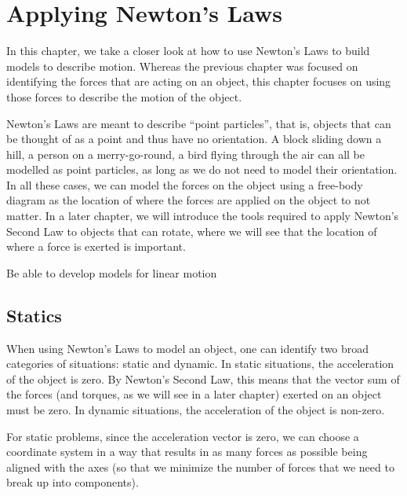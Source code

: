 
\chapter{Applying Newton's Laws}
\label{chap:ApplyingNewtonsLaws}
In this chapter, we take a closer look at how to use Newton's Laws to build models to describe motion. Whereas the previous chapter was focused on identifying the forces that are acting on an object, this chapter focuses on using those forces to describe the motion of the object.

Newton's Laws are meant to describe ``point particles'', that is, objects that can be thought of as a point and thus have no orientation. A block sliding down a hill, a person on a merry-go-round, a bird flying through the air can all be modelled as point particles, as long as we do not need to model their orientation. In all these cases, we can model the forces on the object using a free-body diagram as the location of where the forces are applied on the object to not matter. In a later chapter, we will introduce the tools required to apply Newton's Second Law to objects that can rotate, where we will see that the location of where a force is exerted is important.

\vspace{1cm}
\begin{learningObjectives}
\item Be able to develop models for linear motion
\end{learningObjectives}

\section{Statics}
When using Newton's Laws to model an object, one can identify two broad categories of situations: static and dynamic. In static situations, the acceleration of the object is zero. By Newton's Second Law, this means that the vector sum of the forces (and torques, as we will see in a later chapter) exerted on an object must be zero. In dynamic situations, the acceleration of the object is non-zero. 

For static problems, since the acceleration vector is zero, we can choose a coordinate system in a way that results in as many forces as possible being aligned with the axes (so that we minimize the number of forces that we need to break up into components).

